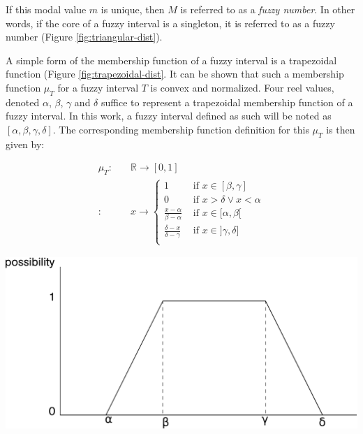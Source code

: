 If this modal value $m$ is unique, then $M$ is referred to as a \emph{fuzzy number}. In other words, if the core of a fuzzy interval is a singleton, it is referred to as a fuzzy number (Figure \ref{fig:triangular-dist}).

A simple form of the membership function of a fuzzy interval is a trapezoidal function (Figure \ref{fig:trapezoidal-dist}. It can be shown that such a membership function $\mu_T$ for a fuzzy interval $T$ is convex and normalized. Four reel values, denoted $\alpha$, $\beta$, $\gamma$ and $\delta$ suffice to represent a trapezoidal membership function of a fuzzy interval. In this work, a fuzzy interval defined as such will be noted as $\left[\alpha, \beta, \gamma, \delta\right]$. The corresponding membership function definition for this $\mu_T$ is then given by:

\begin{align}
\mu_T : & \quad \mathbb{R} \rightarrow \left[0,1\right] \\
 : & \quad x \rightarrow
\begin{cases}
1 & \mbox{ if } x \in [\beta,\gamma] \\
0 & \mbox{ if } x > \delta \vee x < \alpha \\
\frac{x-\alpha}{\beta - \alpha} & \mbox{ if } x \in [\alpha,\beta[ \\
\frac{\delta -x}{\delta - \gamma} & \mbox{ if } x \in ]\gamma,\delta] \\
\end{cases}
\end{align}


\vspace*{13pt}
\begin{center}
{
\includegraphics[scale=0.25]{./graphs/trapezoidalDistribution.pdf}

}
\end{center}
\vspace*{10pt}
\vspace*{13pt}
%  

